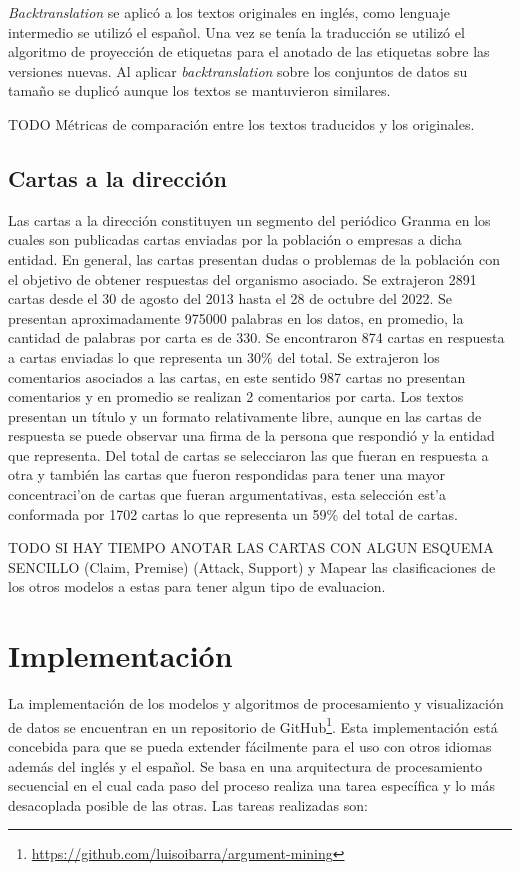 \emph{Backtranslation} se aplicó a los textos originales en inglés, como lenguaje intermedio se utilizó el español.
Una vez se tenía la traducción se utilizó el algoritmo de proyección de etiquetas para el anotado de las etiquetas sobre
las versiones nuevas.
Al aplicar \emph{backtranslation} sobre los conjuntos de datos su tamaño se duplicó aunque los textos se mantuvieron
similares. 

TODO Métricas de comparación entre los textos traducidos y los originales.

\subsection{Cartas a la dirección}

Las cartas a la dirección constituyen un segmento del periódico Granma en los cuales son publicadas
cartas enviadas por la población o empresas a dicha entidad. En general, las cartas 
presentan dudas o problemas de la población con el objetivo de obtener respuestas del organismo
asociado. Se extrajeron 2891 cartas desde el 30 de agosto del 2013 hasta el 28 de octubre del 2022. Se 
presentan aproximadamente 975000 palabras en los datos, en promedio, la cantidad de palabras por carta es de 330.
Se encontraron 874 cartas en respuesta a cartas enviadas lo que representa un 30\% del total. Se extrajeron
los comentarios asociados a las cartas, en este sentido 987 cartas no presentan comentarios y en promedio 
se realizan 2 comentarios por carta. Los textos presentan un título y un formato relativamente libre, 
aunque en las cartas de respuesta se puede observar una firma de la persona que respondió y la entidad que 
representa. Del total de cartas se selecciaron las que fueran en respuesta a otra y también las 
cartas que fueron respondidas para tener una mayor concentraci'on de cartas que fueran argumentativas, 
esta selección est'a conformada por 1702 cartas lo que representa un 59\% del total de cartas.

TODO SI HAY TIEMPO ANOTAR LAS CARTAS CON ALGUN ESQUEMA SENCILLO (Claim, Premise) (Attack, Support) y Mapear 
las clasificaciones de los otros modelos a estas para tener algun tipo de evaluacion.

\section{Implementación}

La implementación de los modelos y algoritmos de procesamiento y visualización de datos se encuentran en 
un repositorio de GitHub\footnote{\url{https://github.com/luisoibarra/argument-mining}}. Esta implementación
está concebida para que se pueda extender fácilmente para el uso con otros idiomas además del inglés y el 
español. Se basa en una arquitectura de procesamiento secuencial en el cual cada paso del proceso realiza
una tarea específica y lo más desacoplada posible de las otras. Las tareas realizadas son:

